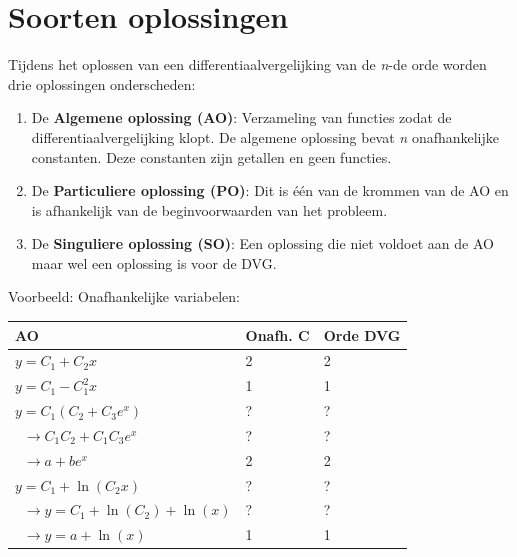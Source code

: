 \documentclass[12pt]{report}
\newcommand{\example}[2]{
    \hrulefill
    
    Voorbeeld: #1
    
    #2
    
    \hrulefill
}
\begin{document}
\section{Soorten oplossingen}
Tijdens het oplossen van een differentiaalvergelijking van de \textit{n}-de orde worden drie oplossingen onderscheden:
\begin{enumerate}
\item De \textbf{Algemene oplossing (AO)}: Verzameling van functies zodat de differentiaalvergelijking klopt. De algemene oplossing bevat \textit{n }onafhankelijke constanten. Deze constanten zijn getallen en geen functies.
\item De \textbf{Particuliere oplossing (PO)}: Dit is één van de krommen van de AO en is afhankelijk van de beginvoorwaarden van het probleem.
\item De \textbf{Singuliere oplossing (SO)}: Een oplossing die niet voldoet aan de AO maar wel een oplossing is voor de DVG.
\end{enumerate}
\example{Onafhankelijke variabelen:}
{
\begin{center}
    \begin{tabular}{l | l | l}
    AO & Onafh. C & Orde DVG \\
    \hline
    $y = C_1 + C_2x$ & 2 & 2 \\
    $y = C_1  - C_1^2x$ & 1 & 1 \\
    \hline
    $y = C_1(C_2 + C_3e^x)$ & ? & ? \\
    $\;\;\rightarrow C_1C_2 + C_1C_3e^x$ & ? & ? \\
    $\;\;\rightarrow a + be^x$ & 2 & 2 \\
    \hline
    $y = C_1 + \ln(C_2 x)$ & ? & ? \\
    $\;\;\rightarrow y = C_1 + \ln(C_2) + \ln(x)$ & ? & ? \\
    $\;\;\rightarrow y = a + \ln(x)$ & 1 & 1


    \end{tabular}
\end{center}
}
\end{document}
